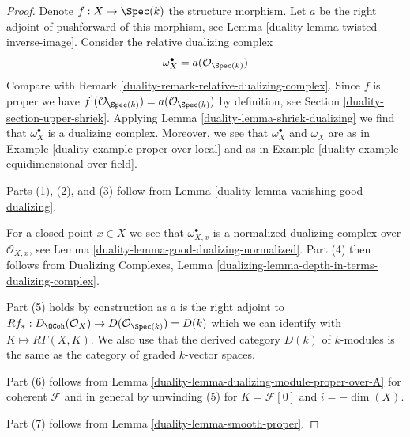 \begin{proof}

Denote $f : X \to \Spec(k)$ the structure morphism. Let $a$ be the
right adjoint of pushforward of this morphism, see
Lemma \ref{duality-lemma-twisted-inverse-image}. Consider the relative dualizing
complex
$$
\omega_X^\bullet = a(\mathcal{O}_{\Spec(k)})
$$
Compare with Remark \ref{duality-remark-relative-dualizing-complex}.
Since $f$ is proper we have
$f^!(\mathcal{O}_{\Spec(k)}) = a(\mathcal{O}_{\Spec(k)})$ by
definition, see Section \ref{duality-section-upper-shriek}.
Applying Lemma \ref{duality-lemma-shriek-dualizing} we find that
$\omega_X^\bullet$ is a dualizing complex. Moreover, we see that
$\omega_X^\bullet$ and $\omega_X$ are as in
Example \ref{duality-example-proper-over-local} and as in
Example \ref{duality-example-equidimensional-over-field}.

\medskip\noindent
Parts (1), (2), and (3) follow from
Lemma \ref{duality-lemma-vanishing-good-dualizing}.

\medskip\noindent
For a closed point $x \in X$ we see that $\omega_{X, x}^\bullet$ is a
normalized dualizing complex over $\mathcal{O}_{X, x}$, see
Lemma \ref{duality-lemma-good-dualizing-normalized}.
Part (4) then follows from Dualizing Complexes, Lemma
\ref{dualizing-lemma-depth-in-terms-dualizing-complex}.

\medskip\noindent
Part (5) holds by construction as $a$ is the right adjoint to
$Rf_* : D_\QCoh(\mathcal{O}_X) \to D(\mathcal{O}_{\Spec(k)}) = D(k)$
which we can identify with $K \mapsto R\Gamma(X, K)$. We also use
that the derived category $D(k)$ of $k$-modules is the same as the
category of graded $k$-vector spaces.

\medskip\noindent
Part (6) follows from Lemma \ref{duality-lemma-dualizing-module-proper-over-A}
for coherent $\mathcal{F}$ and in general by unwinding
(5) for $K = \mathcal{F}[0]$ and $i = -\dim(X)$.

\medskip\noindent
Part (7) follows from Lemma \ref{duality-lemma-smooth-proper}.
\end{proof}

